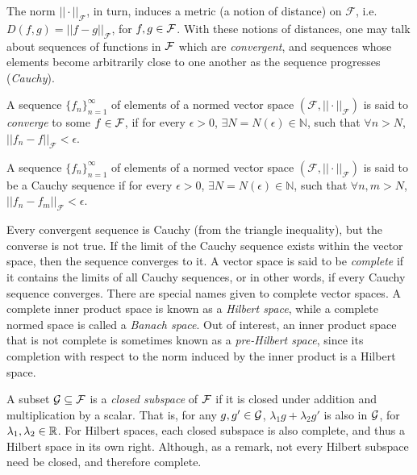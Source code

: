 \newpage
The norm $||\cdot||_{\mathcal F}$, in turn, induces a metric (a notion of distance) on $\mathcal F$, i.e. $D(f,g) = ||f-g||_{\mathcal F}$, for $f,g\in{\mathcal F}$.
With these notions of distances, one may talk about sequences of functions in ${\mathcal F}$ which are \emph{convergent}, and sequences whose elements become arbitrarily close to one another as the sequence progresses (\emph{Cauchy}).
%
\begin{definition}
	A sequence $\{f_n\}_{n=1}^\infty$ of elements of a normed vector space $(\mathcal F, ||\cdot ||_{\mathcal F})$ is said to \emph{converge} to some $f\in{\mathcal F}$, if for every $\epsilon > 0$, $\exists N=N(\epsilon) \in \mathbb N$, such that $\forall n > N$, $||f_n - f||_{\mathcal F} < \epsilon$.
\end{definition}
%
\begin{definition}
	A sequence $\{f_n\}_{n=1}^\infty$ of elements of a normed vector space $(\mathcal F, ||\cdot ||_{\mathcal F})$ is said to be a Cauchy sequence if for every $\epsilon > 0$, $\exists N=N(\epsilon) \in \mathbb N$, such that $\forall n,m > N$, $||f_n - f_m||_{\mathcal F} < \epsilon$.
\end{definition}
%
Every convergent sequence is Cauchy (from the triangle inequality), but the converse is not true.
If the limit of the Cauchy sequence exists within the vector space, then the sequence converges to it.
A vector space is said to be \emph{complete} if it contains the limits of all Cauchy sequences, or in other words, if every Cauchy sequence converges.
There are special names given to complete vector spaces.
A complete inner product space is known as a \emph{Hilbert space}, while a complete normed space is called a \emph{Banach space}.
Out of interest, an inner product space that is not complete is sometimes known as a \emph{pre-Hilbert space}, since its completion with respect to the norm induced by the inner product is a Hilbert space.

A subset ${\mathcal G}\subseteq{\mathcal F}$ is a \emph{closed subspace} of ${\mathcal F}$ if it is closed under addition and multiplication by a scalar.
That is, for any $g,g'\in{\mathcal G}$, $\lambda_1 g + \lambda_2 g'$ is also in ${\mathcal G}$, for $\lambda_1,\lambda_2\in\mathbb{R}$.
For Hilbert spaces, each closed subspace is also complete, and thus a Hilbert space in its own right.
Although, as a remark, not every Hilbert subspace need be closed, and therefore complete. 

